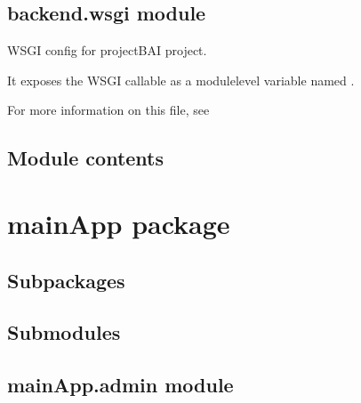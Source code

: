 \documentclass[letterpaper,10pt,polish]{sphinxmanual}
\begin{document}
\subsection{backend.wsgi module}
\label{\detokenize{backend:module-backend.wsgi}}\label{\detokenize{backend:backend-wsgi-module}}
\sphinxAtStartPar
WSGI config for projectBAI project.

\sphinxAtStartPar
It exposes the WSGI callable as a module\sphinxhyphen{}level variable named .

\sphinxAtStartPar
For more information on this file, see


\subsection{Module contents}
\label{\detokenize{backend:module-backend}}\label{\detokenize{backend:module-contents}}
\sphinxstepscope


\section{mainApp package}
\label{\detokenize{mainApp:mainapp-package}}\label{\detokenize{mainApp::doc}}

\subsection{Subpackages}
\label{\detokenize{mainApp:subpackages}}

\subsection{Submodules}
\label{\detokenize{mainApp:submodules}}

\subsection{mainApp.admin module}
\label{\detokenize{mainApp:module-mainApp.admin}}\label{\detokenize{mainApp:mainapp-admin-module}}
\end{document}
